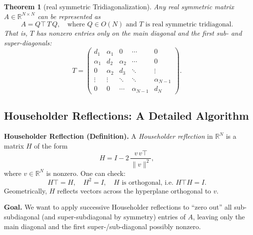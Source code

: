 \documentclass[letterpaper,11pt,oneside,reqno]{article}
\numberwithin{equation}{section}
\newtheorem{theorem}[proposition]{Theorem}
\theoremstyle{definition}
\begin{document}
\begin{theorem}[real symmetric Tridiagonalization]
\label{thm:tridiagonal}
Any real symmetric matrix \(A\in\mathbb{R}^{N\times N}\) can be represented as
\[
  A = Q\top\, T\, Q,
  \quad
  \text{where } Q\in O(N)
  \text{ and } T\text{ is real symmetric tridiagonal.}
\]
That is, \(T\) has nonzero entries only on the main diagonal and the first sub- and super-diagonals:
\[
  T = \begin{pmatrix}
         d_1 & \alpha_1 & 0 & \cdots & 0\\
         \alpha_1 & d_2 & \alpha_2 & \cdots & 0\\
         0 & \alpha_2 & d_3 & \ddots & \vdots\\
         \vdots & \vdots & \ddots & \ddots & \alpha_{N-1}\\
         0 & 0 & \cdots & \alpha_{N-1} & d_N
       \end{pmatrix}.
\]
\end{theorem}

\subsection{Householder Reflections: A Detailed Algorithm}

\noindent
\textbf{Householder Reflection (Definition).}
A \emph{Householder reflection} in \(\mathbb{R}^N\) is a matrix \(H\) of the form
\[
  H = I - 2\,\frac{v\,v\top}{\|v\|^2},
\]
where \(v\in\mathbb{R}^N\) is nonzero. One can check:
\[
  H\top = H,\quad
  H^2 = I,\quad
  H\text{ is orthogonal, i.e.\ }H\top H = I.
\]
Geometrically, \(H\) reflects vectors across the hyperplane orthogonal to \(v\).

\medskip
\noindent
\textbf{Goal.}
We want to apply successive Householder reflections to “zero out” all sub-subdiagonal (and super-subdiagonal by symmetry) entries of \(A\), leaving only the main diagonal and the first super-/sub-diagonal possibly nonzero.
\end{document}
